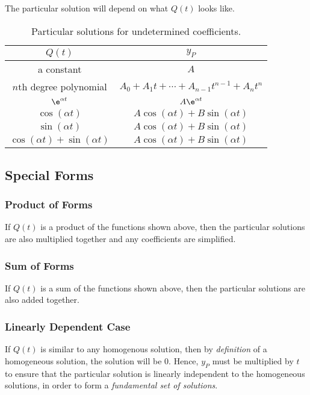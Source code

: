 \documentclass{article}
\begin{document}
The particular solution will depend on what $Q(t)$ looks like.
\begin{table}[H]
    \centering
    \begin{tabular}{c | c}
        \toprule
        $Q(t)$                                                          & $y_P$                                                             \\
        \midrule
        a constant                                                      & $A$                                                               \\
        $n$th degree polynomial                                         & $A_0 + A_1t + \cdots + A_{n-1}t^{n-1} + A_nt^n$                   \\
        $\e^{\alpha t}$                                                 & $A\e^{\alpha t}$                                                  \\
        $\cos{\left( \alpha t \right)}$                                 & $A\cos{\left( \alpha t \right)} + B\sin{\left( \alpha t \right)}$ \\
        $\sin{\left( \alpha t \right)}$                                 & $A\cos{\left( \alpha t \right)} + B\sin{\left( \alpha t \right)}$ \\
        $\cos{\left( \alpha t \right)} + \sin{\left( \alpha t \right)}$ & $A\cos{\left( \alpha t \right)} + B\sin{\left( \alpha t \right)}$ \\
        \bottomrule
    \end{tabular}
    \caption{Particular solutions for undetermined coefficients.}
\end{table}
\subsection{Special Forms}
\subsubsection{Product of Forms}
If $Q(t)$ is a product of the functions shown above, then the
particular solutions are also multiplied together and any coefficients are simplified.
\subsubsection{Sum of Forms}
If $Q(t)$ is a sum of the functions shown above, then the
particular solutions are also added together.
\subsubsection{Linearly Dependent Case}
If $Q(t)$ is similar to any homogenous solution, then by \textit{definition} of
a homogeneous solution, the solution will be $0$. Hence, $y_P$ must be multiplied by $t$
to ensure that the particular solution is linearly independent to the homogeneous solutions,
in order to form a \textit{fundamental set of solutions}.
\end{document}

